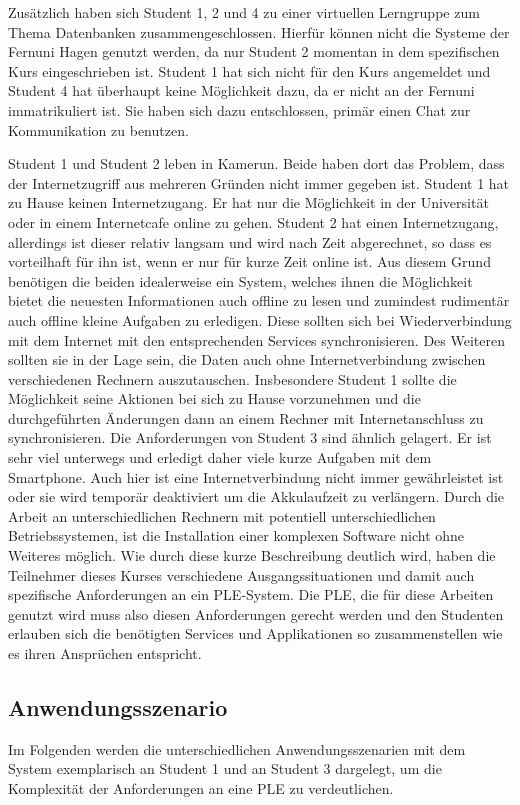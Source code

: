 Zusätzlich haben sich Student 1, 2 und 4 zu einer virtuellen Lerngruppe zum Thema Datenbanken zusammengeschlossen. Hierfür können nicht die Systeme der Fernuni Hagen genutzt werden, da nur Student 2 momentan in dem spezifischen Kurs eingeschrieben ist. Student 1 hat sich nicht für den Kurs angemeldet und Student 4 hat überhaupt keine Möglichkeit dazu, da er nicht an der Fernuni immatrikuliert ist. Sie haben sich dazu entschlossen, primär einen Chat zur Kommunikation zu benutzen.

Student 1 und Student 2 leben in Kamerun. Beide haben dort das Problem, dass der Internetzugriff aus mehreren Gründen nicht immer gegeben ist. Student 1 hat zu Hause keinen Internetzugang. Er hat nur die Möglichkeit in der Universität oder in einem Internetcafe online zu gehen. Student 2 hat einen Internetzugang, allerdings ist dieser relativ langsam und wird nach Zeit abgerechnet, so dass es vorteilhaft für ihn ist, wenn er nur für kurze Zeit online ist. Aus diesem Grund benötigen die beiden idealerweise ein System, welches ihnen die Möglichkeit bietet die neuesten Informationen auch offline zu lesen und zumindest rudimentär auch offline kleine Aufgaben zu erledigen. Diese sollten sich bei Wiederverbindung mit dem Internet mit den entsprechenden Services synchronisieren. Des Weiteren sollten sie in der Lage sein, die Daten auch ohne Internetverbindung zwischen verschiedenen Rechnern auszutauschen. Insbesondere Student 1 sollte die Möglichkeit seine Aktionen bei sich zu Hause vorzunehmen und die durchgeführten Änderungen dann an einem Rechner mit Internetanschluss zu synchronisieren. Die Anforderungen von Student 3 sind ähnlich gelagert. Er ist sehr viel unterwegs und erledigt daher viele kurze Aufgaben mit dem Smartphone. Auch hier ist eine Internetverbindung nicht immer gewährleistet ist oder sie wird temporär deaktiviert um die Akkulaufzeit zu verlängern. Durch die Arbeit an unterschiedlichen Rechnern mit potentiell unterschiedlichen Betriebssystemen, ist die Installation einer komplexen Software nicht ohne Weiteres möglich. Wie durch diese kurze Beschreibung deutlich wird, haben die Teilnehmer dieses Kurses verschiedene Ausgangssituationen und damit auch spezifische Anforderungen an ein PLE-System. Die PLE, die für diese Arbeiten genutzt wird muss also diesen Anforderungen gerecht werden und den Studenten erlauben sich die benötigten Services und Applikationen so zusammenstellen wie es ihren Ansprüchen entspricht.

\subsection{Anwendungsszenario}
Im Folgenden werden die unterschiedlichen Anwendungsszenarien mit dem System exemplarisch an Student 1 und an Student 3 dargelegt, um die Komplexität der Anforderungen an eine PLE zu verdeutlichen.

